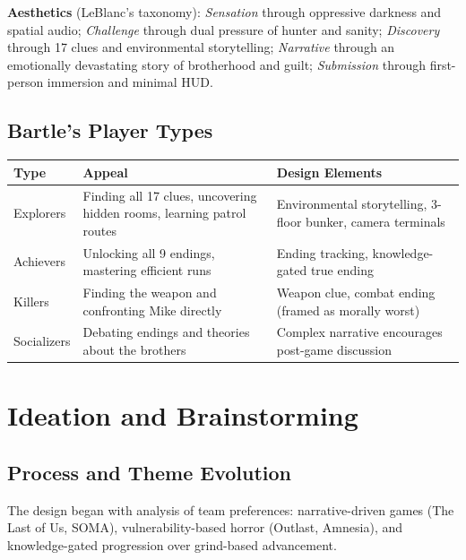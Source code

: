 \documentclass[12pt, letterpaper]{article}
\begin{document}
\textbf{Aesthetics} (LeBlanc's taxonomy): \textit{Sensation} through oppressive darkness and spatial audio; \textit{Challenge} through dual pressure of hunter and sanity; \textit{Discovery} through 17 clues and environmental storytelling; \textit{Narrative} through an emotionally devastating story of brotherhood and guilt; \textit{Submission} through first-person immersion and minimal HUD.

\subsection{Bartle's Player Types}

\begin{table}[h]
\centering
\small
\begin{tabular}{@{}p{2.5cm}p{5cm}p{5cm}@{}}
\toprule
\textbf{Type} & \textbf{Appeal} & \textbf{Design Elements} \\
\midrule
Explorers & Finding all 17 clues, uncovering hidden rooms, learning patrol routes & Environmental storytelling, 3-floor bunker, camera terminals \\
\addlinespace
Achievers & Unlocking all 9 endings, mastering efficient runs & Ending tracking, knowledge-gated true ending \\
\addlinespace
Killers & Finding the weapon and confronting Mike directly & Weapon clue, combat ending (framed as morally worst) \\
\addlinespace
Socializers & Debating endings and theories about the brothers & Complex narrative encourages post-game discussion \\
\bottomrule
\end{tabular}
\end{table}

\section{Ideation and Brainstorming}

\subsection{Process and Theme Evolution}

The design began with analysis of team preferences: narrative-driven games (The Last of Us, SOMA), vulnerability-based horror (Outlast, Amnesia), and knowledge-gated progression over grind-based advancement.
\end{document}
